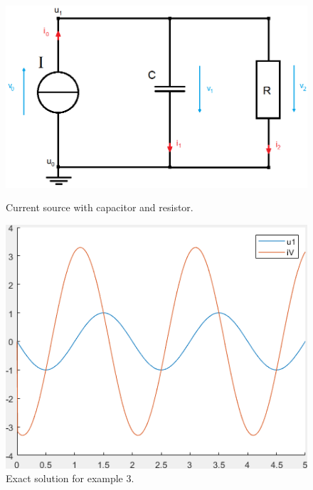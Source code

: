 	\begin{frame}
		\begin{figure}[H]
			\centering
			\begin{minipage}{.5\textwidth}
				\centering
				\includegraphics[width=\linewidth]{../Tex/pictures/Example3.png}
				\caption{Current source with capacitor and resistor.}
				\label{fig:num ex3}
			\end{minipage}%
			\begin{minipage}{.5\textwidth}
				\centering
				\includegraphics[width=\linewidth]{../Tex/pictures/exact_solution_ex3.png}
				\caption{Exact solution for example 3.}
				\label{fig: Exact solution for example 3}
			\end{minipage}
		\end{figure}
	\end{frame}
	
